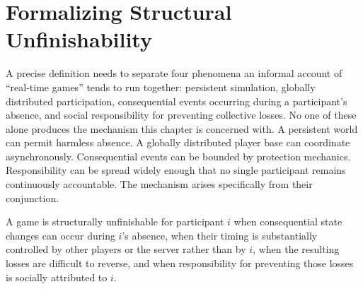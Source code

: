 \section{Formalizing Structural Unfinishability}

A precise definition needs to separate four phenomena an informal account of ``real-time games'' tends to run together: persistent simulation, globally distributed participation, consequential events occurring during a participant's absence, and social responsibility for preventing collective losses. No one of these alone produces the mechanism this chapter is concerned with. A persistent world can permit harmless absence. A globally distributed player base can coordinate asynchronously. Consequential events can be bounded by protection mechanics. Responsibility can be spread widely enough that no single participant remains continuously accountable. The mechanism arises specifically from their conjunction.

\begin{definition}
A game is structurally unfinishable for participant $i$ when consequential state changes can occur during $i$'s absence, when their timing is substantially controlled by other players or the server rather than by $i$, when the resulting losses are difficult to reverse, and when responsibility for preventing those losses is socially attributed to $i$.
\end{definition}

